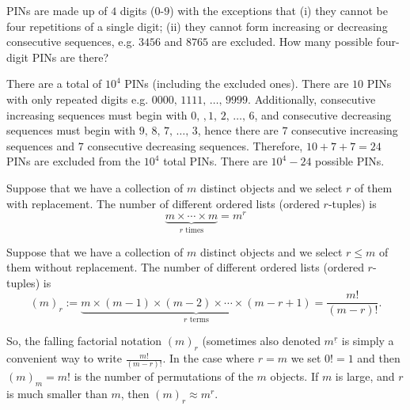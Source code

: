 \documentclass[10pt, a4paper]{article}
\begin{document}
\begin{example}
    PINs are made up of $4$ digits ($0$-$9$) with the exceptions that (i) they cannot be four repetitions of a single digit; (ii) they cannot form increasing or decreasing consecutive sequences, e.g. $3456$ and $8765$ are excluded. How many possible four-digit PINs are there?

    There are a total of $10 ^ 4$ PINs (including the excluded ones). There are $10$ PINs with only repeated digits e.g. $0000,\,1111,\,\dotsc,\,9999$. Additionally, consecutive increasing sequences must begin with $0,\,,1,\,2,\,\dotsc,\,6$, and consecutive decreasing sequences must begin with $9,\,8,\,7,\,\dotsc,\,3$, hence there are $7$ consecutive increasing sequences and $7$ consecutive decreasing sequences. Therefore, $10 + 7 + 7 = 24$ PINs are excluded from the $10 ^ 4$ total PINs. There are $10 ^ 4 - 24$ possible PINs. 
\end{example}

\begin{countprinc}
    Suppose that we have a collection of $m$ distinct objects and we select $r$ of them with replacement. The number of different ordered lists (ordered $r$-tuples) is
    \[
    \underbrace{m \times \dotsi \times m}_{r \text{ times}} = m ^ r
    \]
\end{countprinc}

\begin{countprinc}
    Suppose that we have a collection of $m$ distinct objects and we select $r \leq m$ of them without replacement. The number of different ordered lists (ordered $r$-tuples) is
    \[
    (m)_r := \underbrace{m \times (m - 1) \times (m - 2) \times \dotsi \times (m - r + 1)}_{r \text{ terms}} = \frac{m!}{(m - r)!}.
    \]
\end{countprinc}
So, the falling factorial notation $(m)_r$ (sometimes also denoted $m ^ {\underline{r}}$ is simply a convenient way to write $\frac{m!}{(m - r)!}$. In the case where $r = m$ we set $0! = 1$ and then $(m)_m = m!$ is the number of permutations of the $m$ objects. If $m$ is large, and $r$ is much smaller than $m$, then $(m)_r \approx m ^ r$.
\end{document}
